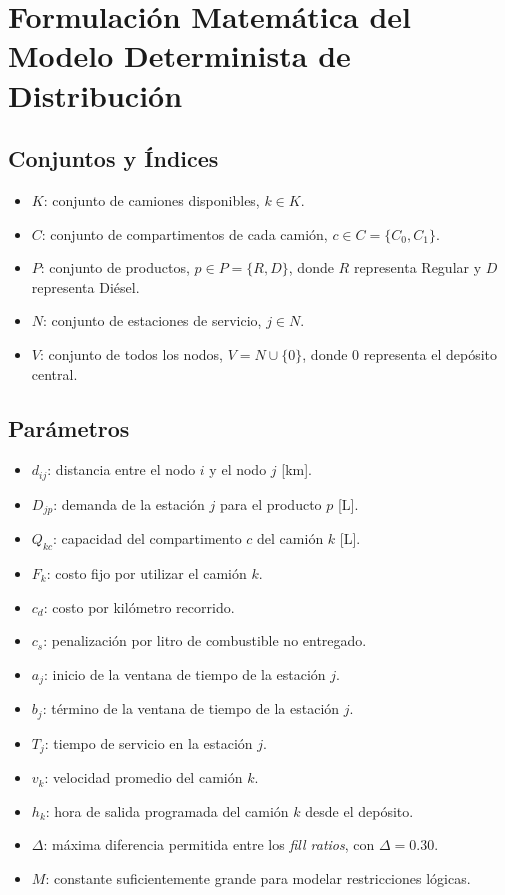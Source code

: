 \section{Formulación Matemática del Modelo Determinista de Distribución}

\subsection{Conjuntos y Índices}

\begin{itemize}
    \item $K$: conjunto de camiones disponibles, $k \in K$.
    \item $C$: conjunto de compartimentos de cada camión, $c \in C = \{C_0, C_1\}$.
    \item $P$: conjunto de productos, $p \in P = \{R, D\}$, donde $R$ representa Regular y $D$ representa Diésel.
    \item $N$: conjunto de estaciones de servicio, $j \in N$.
    \item $V$: conjunto de todos los nodos, $V = N \cup \{0\}$, donde $0$ representa el depósito central.
\end{itemize}

\subsection{Parámetros}

\begin{itemize}
    \item $d_{ij}$: distancia entre el nodo $i$ y el nodo $j$ [km].
    \item $D_{jp}$: demanda de la estación $j$ para el producto $p$ [L].
    \item $Q_{kc}$: capacidad del compartimento $c$ del camión $k$ [L].
    \item $F_k$: costo fijo por utilizar el camión $k$.
    \item $c_d$: costo por kilómetro recorrido.
    \item $c_s$: penalización por litro de combustible no entregado.
    \item $a_j$: inicio de la ventana de tiempo de la estación $j$.
    \item $b_j$: término de la ventana de tiempo de la estación $j$.
    \item $T_j$: tiempo de servicio en la estación $j$.
    \item $v_k$: velocidad promedio del camión $k$.
    \item $h_k$: hora de salida programada del camión $k$ desde el depósito.
    \item $\Delta$: máxima diferencia permitida entre los \textit{fill ratios}, con $\Delta = 0.30$.
    \item $M$: constante suficientemente grande para modelar restricciones lógicas.
\end{itemize}

